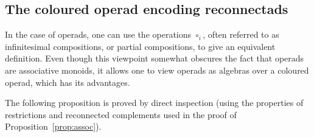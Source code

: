\documentclass[11pt]{article}
\theoremstyle{definition}
\numberwithin{equation}{section}
\begin{document}
\subsection{The coloured operad encoding reconnectads}

In the case of operads, one can use the operations $\circ_i$, often referred to as infinitesimal compositions, or partial compositions, to give an equivalent definition. Even though this viewpoint somewhat obscures the fact that operads are associative monoids, it allows one to view operads as algebras over a coloured operad, which has its advantages.

The following proposition is proved by direct inspection (using the properties of restrictions and reconnected complements used in the proof of Proposition~\ref{prop:assoc}).
\end{document}
